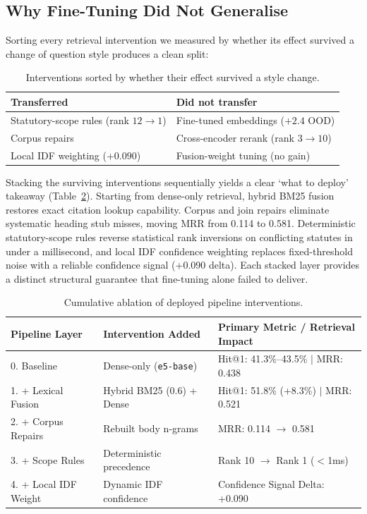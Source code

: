 \documentclass[conference]{IEEEtran}
\begin{document}
\subsection{Why Fine-Tuning Did Not Generalise}
\label{sec:whynot}
Sorting every retrieval intervention we measured by whether its effect
survived a change of question style produces a clean split:

\begin{table}[t]
\caption{Interventions sorted by whether their effect survived a style change.}
\label{tab:interventions}
\centering
\footnotesize
\begin{tabular}{@{}ll@{}}
\toprule
Transferred & Did not transfer \\
\midrule
Statutory-scope rules (rank $12\!\to\!1$) & Fine-tuned embeddings ($+2.4$ OOD) \\
Corpus repairs & Cross-encoder rerank (rank $3\!\to\!10$) \\
Local IDF weighting ($+0.090$) & Fusion-weight tuning (no gain) \\
\bottomrule
\end{tabular}
\end{table}

Stacking the surviving interventions sequentially yields a clear `what to deploy' takeaway (Table~\ref{tab:cumulative}). Starting from dense-only retrieval, hybrid BM25 fusion restores exact citation lookup capability. Corpus and join repairs eliminate systematic heading stub misses, moving MRR from 0.114 to 0.581. Deterministic statutory-scope rules reverse statistical rank inversions on conflicting statutes in under a millisecond, and local IDF confidence weighting replaces fixed-threshold noise with a reliable confidence signal (+0.090 delta). Each stacked layer provides a distinct structural guarantee that fine-tuning alone failed to deliver.

\begin{table}[t]
\caption{Cumulative ablation of deployed pipeline interventions.}
\label{tab:cumulative}
\centering
\footnotesize
\begin{tabular}{@{}lll@{}}
\toprule
Pipeline Layer & Intervention Added & Primary Metric / Retrieval Impact \\
\midrule
0. Baseline & Dense-only (\texttt{e5-base}) & Hit@1: 41.3\%--43.5\% $|$ MRR: 0.438 \\
1. + Lexical Fusion & Hybrid BM25 (0.6) + Dense & Hit@1: 51.8\% (+8.3\%) $|$ MRR: 0.521 \\
2. + Corpus Repairs & Rebuilt body n-grams & MRR: 0.114 $\to$ 0.581 \\
3. + Scope Rules & Deterministic precedence & Rank 10 $\to$ Rank 1 ($<$1ms) \\
4. + Local IDF Weight & Dynamic IDF confidence & Confidence Signal Delta: +0.090 \\
\bottomrule
\end{tabular}
\end{table}
\end{document}
